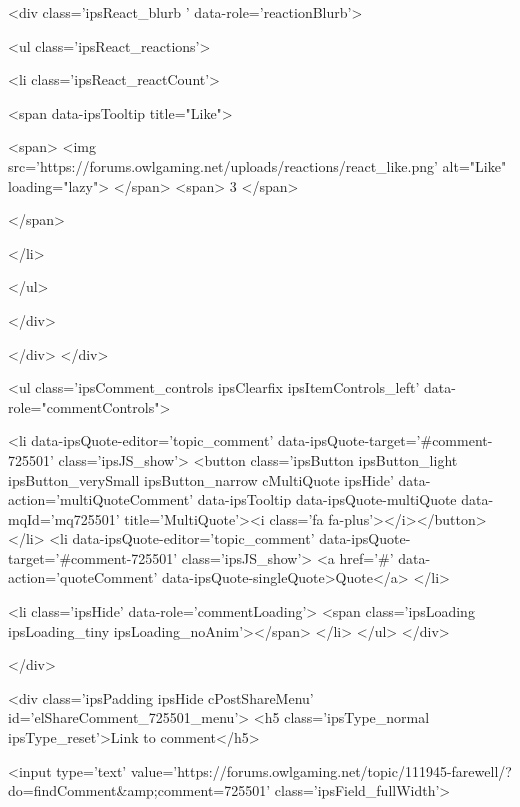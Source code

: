 				
				<div class='ipsReact_blurb ' data-role='reactionBlurb'>
					
						

	
	<ul class='ipsReact_reactions'>
		
		
			
				
				<li class='ipsReact_reactCount'>
					
						<span data-ipsTooltip title="Like">
					
							<span>
								<img src='https://forums.owlgaming.net/uploads/reactions/react_like.png' alt="Like" loading="lazy">
							</span>
							<span>
								3
							</span>
					
						</span>
					
				</li>
			
		
	</ul>

					
				</div>
			
			
			
		</div>
	</div>

					
				
				<ul class='ipsComment_controls ipsClearfix ipsItemControls_left' data-role="commentControls">
					
						
							<li data-ipsQuote-editor='topic_comment' data-ipsQuote-target='#comment-725501' class='ipsJS_show'>
								<button class='ipsButton ipsButton_light ipsButton_verySmall ipsButton_narrow cMultiQuote ipsHide' data-action='multiQuoteComment' data-ipsTooltip data-ipsQuote-multiQuote data-mqId='mq725501' title='MultiQuote'><i class='fa fa-plus'></i></button>
							</li>
							<li data-ipsQuote-editor='topic_comment' data-ipsQuote-target='#comment-725501' class='ipsJS_show'>
								<a href='#' data-action='quoteComment' data-ipsQuote-singleQuote>Quote</a>
							</li>
						
						
						
					
					<li class='ipsHide' data-role='commentLoading'>
						<span class='ipsLoading ipsLoading_tiny ipsLoading_noAnim'></span>
					</li>
				</ul>
			</div>
		

		
	</div>

	

	



<div class='ipsPadding ipsHide cPostShareMenu' id='elShareComment_725501_menu'>
	<h5 class='ipsType_normal ipsType_reset'>Link to comment</h5>
	
		
	
	
	<input type='text' value='https://forums.owlgaming.net/topic/111945-farewell/?do=findComment&amp;comment=725501' class='ipsField_fullWidth'>

